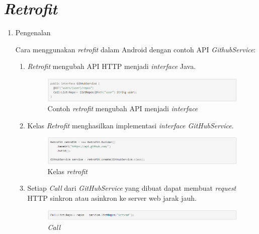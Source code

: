 \section{\emph{Retrofit}}

\begin{enumerate}
\item Pengenalan

Cara menggunakan \textit{retrofit} dalam Android dengan contoh API \textit{GithubService}:

	\begin{enumerate}
	\item \textit{Retrofit} mengubah API HTTP menjadi \textit{interface} Java.
	\begin{figure}[H]
		\centering
		\includegraphics[keepaspectratio, width=12cm]{gambar/retrofit1}
		\caption{Contoh \textit{retrofit} mengubah API menjadi \textit{interface} \citep{retrofit2023}}
		\label{gambar:gambar_49}
	\end{figure}
	
	\item Kelas \textit{Retrofit} menghasilkan implementasi \textit{interface GitHubService}.
	\begin{figure}[H]
		\centering
		\includegraphics[keepaspectratio, width=12cm]{gambar/retrofit2}
		\caption{Kelas \textit{retrofit} \citep{retrofit2023}}
		\label{gambar:gambar_50}
	\end{figure}
	
	\item Setiap \textit{Call} dari \textit{GitHubService} yang dibuat dapat membuat \textit{request} HTTP sinkron atau asinkron ke server web jarak jauh.
	\begin{figure}[H]
		\centering
		\includegraphics[keepaspectratio, width=12cm]{gambar/retrofit3}
		\caption{\textit{Call} \citep{retrofit2023}}
		\label{gambar:gambar_51}
	\end{figure}
	\end{enumerate}


\end{enumerate}
